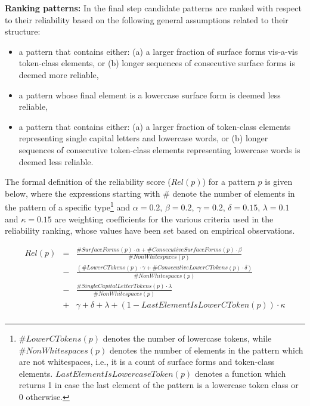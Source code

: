 \documentclass[output=paper]{langsci/langscibook}
\begin{document}
\vspace{0.3cm}
\noindent\textbf{Ranking patterns:} In the final step candidate patterns are ranked with respect to their reliability based on the
following general assumptions related to their structure: 
\begin{itemize}
\item a pattern that contains either: (a) a larger fraction of surface forms vis-a-vis token-class elements, or (b) longer sequences of consecutive surface forms is deemed more reliable,
\item a pattern whose final element is a lowercase surface form is deemed less reliable,
\item a pattern that contains either: (a) a larger fraction of token-class elements representing single capital letters and lowercase words,
or (b) longer sequences of consecutive token-class elements representing lowercase words is deemed less reliable.
\end{itemize}

\noindent The formal definition of the reliability score ($Rel(p)$) for a pattern $p$ is given below, where the expressions starting with $\#$ denote the number of elements in the pattern of a specific type\footnote{$\#LowerCTokens(p)$ denotes the number of lowercase tokens, while $\#NonWhitespaces(p)$ denotes the number of elements in the pattern which are not whitespaces, i.e., it is a count of surface forms and token-class elements. $LastElementIsLowercaseToken(p)$ denotes a function which returns 1 in case the last element of the pattern is a lowercase token class or 0 otherwise.} and $\alpha=0.2$, $\beta=0.2$, $\gamma=0.2$, $\delta=0.15$, $\lambda=0.1$ and $\kappa=0.15$ are weighting coefficients for the various criteria used in the reliability ranking, whose values have been set based on empirical observations.  

\begin{eqnarray*}
Rel(p) & = & \frac{\#SurfaceForms(p) \cdot \alpha +
  \#ConsecutiveSurfaceForms(p) \cdot \beta}{\#NonWhitespaces(p)} \\ &
- & \frac{(\#LowerCTokens(p) \cdot \gamma +
  \#ConsecutiveLowerCTokens(p) \cdot \delta)}{\#NonWhitespaces(p)}\\ &
- & \frac{\#SingleCapitalLetterTokens(p) \cdot
  \lambda}{\#NonWhitespaces(p)}\\ & + & \gamma + \delta + \lambda + (1
- LastElementIsLowerCToken(p)) \cdot \kappa \\
\end{eqnarray*}
\end{document}
